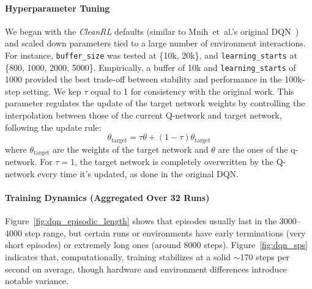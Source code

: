 \paragraph{Hyperparameter Tuning}
We began with the \emph{CleanRL} defaults (similar to Mnih~et~al.'s original DQN~\cite{mnih:atari}) and
scaled down parameters tied to a large number of environment interactions. For instance,
\texttt{buffer\_size} was tested at \{10k, 20k\}, and \texttt{learning\_starts} 
at \{800, 1000, 2000, 5000\}. Empirically, a buffer of 10k 
and \texttt{learning\_starts} of 1000 provided the best trade-off between stability 
and performance in the 100k-step setting. We kep $\tau$ equal to \num{1} for consistency with the original work.
This parameter regulates the update of the target network weights by controlling the interpolation between those of the 
current Q-network and target network, following the update rule:
$$
\theta_{\text{target}} = \tau \theta + (1 - \tau) \theta_{\text{target}}
$$
where $\theta_{\text{target}}$ are the weights of the target network and $\theta$ are the ones of the q-network.
For \(\tau = 1\), the target network is completely overwritten by the Q-network 
every time it's updated, as done in the original DQN.

\paragraph{Training Dynamics (Aggregated Over 32 Runs)}
Figure~\ref{fig:dqn_episodic_length} shows that episodes usually last in the 3000--4000 step range, 
but certain runs or environments have early terminations (very short episodes) or extremely long ones (around 8000 steps).  
Figure~\ref{fig:dqn_sps} indicates that, computationally, training stabilizes at a solid 
\(\sim\)170 steps per second on average, though hardware and environment differences 
introduce notable variance.

